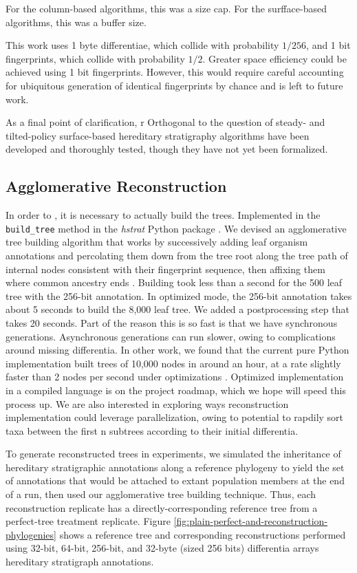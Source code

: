 For the column-based algorithms, this was a size cap.
For the surfface-based algorithms, this was a buffer size.

This work uses 1 byte differentiae, which collide with probability $1/256$, and 1 bit fingerprints, which collide with probability $1/2$.
Greater space efficiency could be achieved using 1 bit fingerprints.
However, this would require careful accounting for ubiquitous generation of identical fingerprints by chance and is left to future work.

As a final point of clarification, r
Orthogonal to the question of steady- and tilted-policy surface-based hereditary stratigraphy algorithms have been developed and thoroughly tested, though they have not yet been formalized.

\subsection{Agglomerative Reconstruction}

In order to , it is necessary to actually build the trees.
Implemented in the \texttt{build_tree} method in the \textit{hstrat} Python package \citep{moreno2022hstrat}.
We devised an agglomerative tree building algorithm that works by successively adding leaf organism annotations and percolating them down from the tree root along the tree path of internal nodes consistent with their fingerprint sequence, then affixing them where common ancestry ends \citep{moreno2024analysis}.
Building took less than a second for the 500 leaf tree with the 256-bit annotation.
In optimized mode, the 256-bit annotation takes about 5 seconds to build the 8,000 leaf tree.
We added a postprocessing step that takes 20 seconds.
Part of the reason this is so fast is that we have synchronous generations.
Asynchronous generations can run slower, owing to complications around missing differentia.
In other work, we found that the current pure Python implementation built trees of 10,000 nodes in around an hour, at a rate slightly faster than 2 nodes per second under optimizations \citep{moreno2024trackable}.
Optimized implementation in a compiled language is on the project roadmap, which we hope will speed this process up.
We are also interested in exploring ways reconstruction implementation could leverage parallelization, owing to potential to rapdily sort taxa between the first n subtrees according to their initial differentia.

To generate reconstructed trees in experiments, we simulated the inheritance of hereditary stratigraphic annotations along a reference phylogeny to yield the set of annotations that would be attached to extant population members at the end of a run, then used our agglomerative tree building technique.
Thus, each reconstruction replicate has a directly-corresponding reference tree from a perfect-tree treatment replicate.
Figure \ref{fig:plain-perfect-and-reconstruction-phylogenies} shows a reference tree and corresponding reconstructions performed using 32-bit, 64-bit, 256-bit, and 32-byte (sized 256 bits) differentia arrays hereditary stratigraph annotations.


